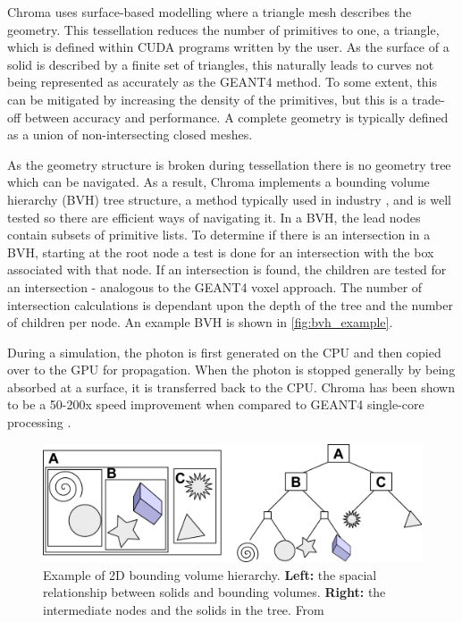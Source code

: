 Chroma uses surface-based modelling where a triangle mesh describes the geometry.
This tessellation reduces the number of primitives to one, a triangle, which is defined within CUDA programs written by the user.
As the surface of a solid is described by a finite set of triangles, this naturally leads to curves not being represented as accurately as the GEANT4 method.
To some extent, this can be mitigated by increasing the density of the primitives, but this is a trade-off between accuracy and performance.
A complete geometry is typically defined as a union of non-intersecting closed meshes.
\par
As the geometry structure is broken during tessellation there is no geometry tree which can be navigated.
As a result, Chroma implements a bounding volume hierarchy (BVH) tree structure, a method typically used in industry \cite{real_time_collision_detection_ref}, and is well tested so there are efficient ways of navigating it.
In a BVH, the lead nodes contain subsets of primitive lists.
To determine if there is an intersection in a BVH, starting at the root node a test is done for an intersection with the box associated with that node.
If an intersection is found, the children are tested for an intersection - analogous to the GEANT4 voxel approach.
The number of intersection calculations is dependant upon the depth of the tree and the number of children per node.
An example BVH is shown in \autoref{fig:bvh_example}.
\par
During a simulation, the photon is first generated on the CPU and then copied over to the GPU for propagation.
When the photon is stopped generally by being absorbed at a surface, it is transferred back to the CPU.
Chroma has been shown to be a 50-200x speed improvement when compared to GEANT4 single-core processing \cite{chroma_whitepaper_ref,chroma_presentation_ref}.
\begin{figure}
    \centering
    \includegraphics[width=\textwidth]{Figures/Simulations/bounding_volume_hierarchy.png}
    \caption{Example of 2D bounding volume hierarchy. 
             \textbf{Left:} the spacial relationship between solids and bounding volumes.
             \textbf{Right:} the intermediate nodes and the solids in the tree.
             From \cite{bounding_box_ref}}
    \label{fig:bvh_example}
\end{figure}
